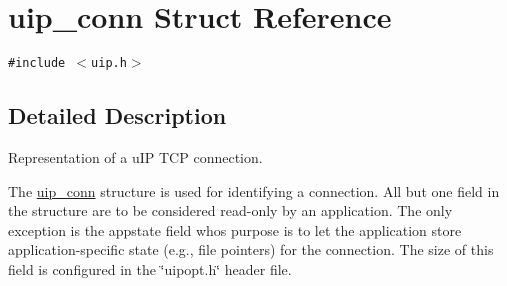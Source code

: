 \hypertarget{a00028}{
\section{uip\_\-conn Struct Reference}
\label{a00028}
}
{\tt \#include $<$uip.h$>$}



\subsection{Detailed Description}
Representation of a u\-IP TCP connection. 

The \hyperlink{a00028}{uip\_\-conn} structure is used for identifying a connection. All but one field in the structure are to be considered read-only by an application. The only exception is the appstate field whos purpose is to let the application store application-specific state (e.g., file pointers) for the connection. The size of this field is configured in the \char`\"{}uipopt.h\char`\"{} header file. 

